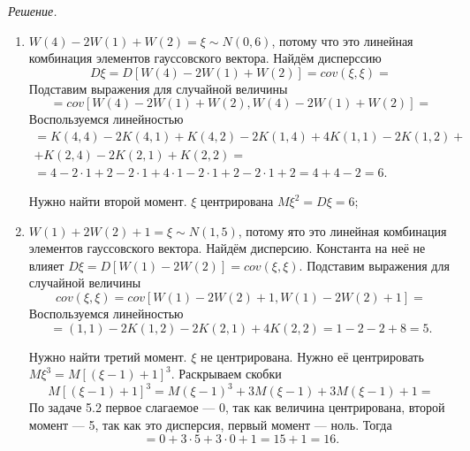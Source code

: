 \textit{Решение.}
\begin{enumerate}[label=\alph*)]
  \item $W \left( 4 \right) - 2W \left( 1 \right) + W \left( 2 \right) =
    \xi \sim
    N \left( 0, 6 \right) $,
  потому что это линейная комбинация элементов гауссовского вектора.
  Найдём дисперссию
  $$D \xi =
    D \left[ W \left( 4 \right) - 2W \left( 1 \right) + W \left( 2 \right) \right] =
    cov \left( \xi, \xi \right) =$$
  Подставим выражения для случайной величины
  $$= cov \left[
      W \left( 4 \right) - 2W \left( 1 \right) + W \left( 2 \right),
      W \left( 4 \right) - 2W \left( 1 \right) + W \left( 2 \right) \right] =$$
  Воспользуемся линейностью
  \begin{gather*}
    = K \left( 4, 4 \right) - 2K \left( 4, 1 \right) + K \left( 4, 2 \right) -
    2K \left( 1, 4 \right) + 4K \left( 1, 1 \right) - 2K \left( 1, 2 \right) + \\
    + K \left( 2, 4 \right) - 2K \left( 2, 1 \right) + K \left( 2, 2 \right) = \\
    = 4 - 2 \cdot 1 + 2 - 2 \cdot 1 + 4 \cdot 1 - 2 \cdot 1 + 2 - 2 \cdot 1 + 2 =
    4 + 4 - 2 =
    6.
  \end{gather*}

  Нужно найти второй момент.
  $ \xi $ центрирована $M \xi^2 = D \xi = 6$;
  \item $W \left( 1 \right) + 2W \left( 2 \right) + 1 =
    \xi \sim
    N \left( 1, 5 \right) $,
  потому ято это линейная комбинация элементов гауссовского вектора.
  Найдём дисперсию.
  Константа на неё не влияет
  $D \xi =
    D \left[ W \left( 1 \right) - 2W \left( 2 \right) \right] =
    cov \left( \xi, \xi \right) $.
  Подставим выражения для случайной величины
  $$cov \left( \xi, \xi \right) =
    cov \left[
      W \left( 1 \right) - 2W \left( 2 \right) + 1,
      W \left( 1 \right) - 2W \left( 2 \right) + 1 \right] =$$
  Воспользуемся линейностью
  $$= \left( 1, 1 \right) - 2K \left( 1, 2 \right) - 2K \left( 2, 1 \right) +
    4K \left( 2, 2 \right) =
    1 - 2 - 2 + 8 =
    5.$$

  Нужно найти третий момент.
  $ \xi $ не центрирована.
  Нужно её центрировать $M \xi^3 = M \left[ \left( \xi - 1 \right) + 1 \right]^3$.
  Раскрываем скобки
  $$M \left[ \left( \xi - 1 \right) + 1 \right]^3 =
    M \left( \xi - 1 \right)^3 + 3M \left( \xi - 1 \right) + 3M \left( \xi - 1 \right) + 1 =$$
  По задаче 5.2 первое слагаемое --- 0, так как величина центрирована, второй момент --- 5,
  так как это дисперсия, первый момент --- ноль.
  Тогда
  $$= 0 + 3 \cdot 5 + 3 \cdot 0 + 1 = 15 + 1 = 16.$$
\end{enumerate}
